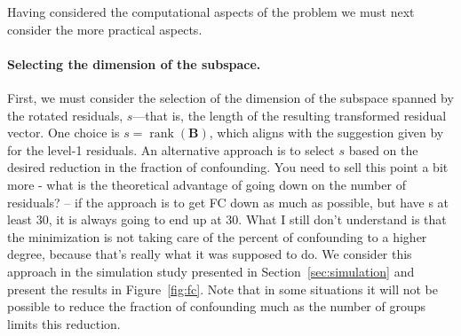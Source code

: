 \documentclass[12pt]{article} %
\newcommand{\hh}[1]{{\color{orange} #1}}
\newcommand{\al}[1]{{\color{red} #1}}
\newcommand{\ginv}{\ensuremath{^{-}}}
\DeclareMathOperator{\rank}{rank}
\begin{document}
Having considered the computational aspects of the problem we must next consider the more practical aspects. 

\paragraph{Selecting the dimension of the subspace.}
First, we must consider the selection of the dimension of the subspace spanned by the rotated residuals, $s$---that is, the length of the resulting transformed residual vector. One choice is $s = \rank(\bm{B})$, which aligns with the suggestion given by \cite{HildenMinton:1995wh} for the level-1 residuals. 
An alternative approach is to select $s$ based on the desired reduction in the fraction of confounding. \hh{You need to sell this point a bit more - what is the theoretical advantage of going down on the number of residuals? -- if the approach is to get FC down as much as possible, but have s at least 30, it is always going to end up at 30. What I still don't understand is that the minimization is not taking care of the percent of confounding to a higher degree, because that's really what it was supposed to do. }
We consider this approach in the simulation study presented in Section~\ref{sec:simulation} and present the results in Figure~\ref{fig:fc}. Note that in some situations it will not be possible to reduce the fraction of confounding much as the number of groups limits this reduction.
\end{document}

